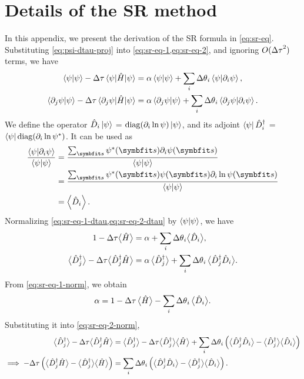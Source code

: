 \chapter{Details of the SR method}
\label{append:sr}

In this appendix, we present the derivation of the SR formula in \cref{eq:sr-eq}. Substituting \cref{eq:psi-dtau-proj} into \cref{eq:sr-eq-1,eq:sr-eq-2}, and ignoring $O({\Delta \tau}^2)$ terms, we have
\begin{align}
\ip{\psi} - \dta \ev{\hat{H}}{\psi} &= \alpha \ip{\psi} + \sum_i \dth_i \ip{\psi}{\pp_i \psi}, \label{eq:sr-eq-1-dtau} \\
\ip{\pp_j \psi}{\psi} - \dta \mel{\pp_j \psi}{\hat{H}}{\psi} &= \alpha \ip{\pp_j \psi}{\psi} + \sum_i \dth_i \ip{\pp_j \psi}{\pp_i \psi}. \label{eq:sr-eq-2-dtau}
\end{align}
We define the operator $\hat{D}_i \ket{\psi}$ = $\mathrm{diag}(\partial_i \ln \psi) \ket{\psi}$, and its adjoint $\bra{\psi} \hat{D}^\dagger_i$ = $\bra{\psi} \mathrm{diag}(\partial_i \ln \psi^*)$. It can be used as
\begin{align}
\fpsps{\ip{\psi}{\pp_i \psi}}
&= \fpsps{\sum_\vs \psi^*(\vs) \pp_i \psi(\vs)} \\
&= \fpsps{\sum_\vs \psi^*(\vs) \psi(\vs) \pp_i \ln \psi(\vs)} \\
&= \ev{\hat{D}_i}.
\end{align}
Normalizing \cref{eq:sr-eq-1-dtau,eq:sr-eq-2-dtau} by $\ip{\psi}$, we have
\begin{align}
1 - {\Delta \tau} \big\langle \hat{H} \big\rangle &= \alpha + \sum_i {\Delta \theta}_i \big\langle \hat{D}_i \big\rangle, \label{eq:sr-eq-1-norm} \\
\big\langle \hat{D}^\dagger_j \big\rangle - {\Delta \tau} \big\langle \hat{D}^\dagger_j \hat{H} \big\rangle &= \alpha\,\big\langle \hat{D}^\dagger_j \big\rangle + \sum_i {\Delta \theta}_i\,\big\langle \hat{D}^\dagger_j \hat{D}_i \big\rangle. \label{eq:sr-eq-2-norm}
\end{align}
From \cref{eq:sr-eq-1-norm}, we obtain
\begin{equation}
\alpha = 1 - {\Delta \tau}\,\big\langle \hat{H} \big\rangle - \sum_i {\Delta \theta}_i\,\big\langle \hat{D}_i \big\rangle.
\end{equation}
Substituting it into \cref{eq:sr-eq-2-norm},
\begin{align}
\big\langle \hat{D}^\dagger_j \big\rangle - {\Delta \tau} \big\langle \hat{D}^\dagger_j \hat{H} \big\rangle
&= \big\langle \hat{D}^\dagger_j \big\rangle
- {\Delta \tau} \big\langle \hat{D}^\dagger_j \big\rangle \big\langle \hat{H} \big\rangle
+ \sum_i {\Delta \theta}_i \left( \big\langle \hat{D}^\dagger_j \hat{D}_i \big\rangle - \big\langle \hat{D}^\dagger_j \big\rangle \big\langle \hat{D}_i \big\rangle \right) \\
\implies
-{\Delta \tau} \left( \big\langle \hat{D}^\dagger_j \hat{H} \big\rangle - \big\langle \hat{D}^\dagger_j \big\rangle \big\langle \hat{H} \big\rangle \right)
&= \sum_i {\Delta \theta}_i \left( \big\langle \hat{D}^\dagger_j \hat{D}_i \big\rangle - \big\langle \hat{D}^\dagger_j \big\rangle \big\langle \hat{D}_i \big\rangle \right).
\end{align}
